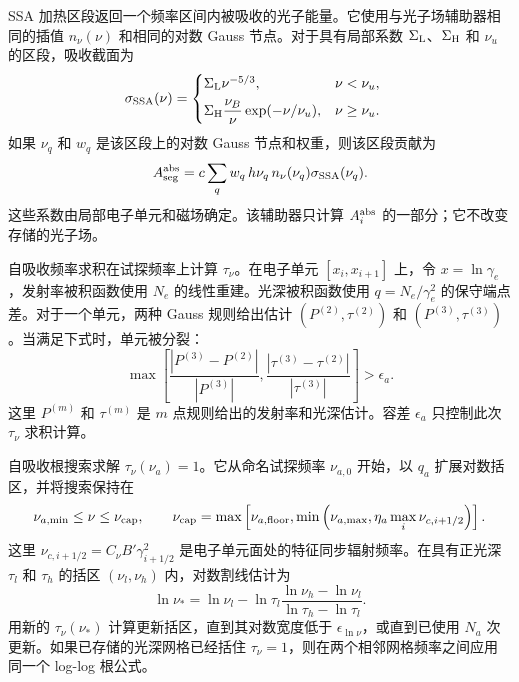 \documentclass[twocolumn]{aastex702}
\begin{document}
SSA 加热区段返回一个频率区间内被吸收的光子能量。它使用与光子场辅助器相同的插值 \(n_\nu(\nu)\) 和相同的对数 Gauss 节点。对于具有局部系数 \(\Sigma_{\rm L}\)、\(\Sigma_{\rm H}\) 和 \(\nu_u\) 的区段，吸收截面为
\begin{equation}
\begin{aligned}
\sigma_{\rm SSA}(\nu)&=
\begin{cases}
\Sigma_{\rm L}\nu^{-5/3}, & \nu<\nu_u,\\[1ex]
\Sigma_{\rm H}\dfrac{\nu_B}{\nu}\exp(-\nu/\nu_u), & \nu\ge\nu_u .
\end{cases}
\end{aligned}
\end{equation}
如果 \(\nu_q\) 和 \(w_q\) 是该区段上的对数 Gauss 节点和权重，则该区段贡献为
\begin{equation}
A_{\rm seg}^{\rm abs}
=c\sum_q w_q\,h\nu_q\,n_\nu(\nu_q)\sigma_{\rm SSA}(\nu_q).
\end{equation}
这些系数由局部电子单元和磁场确定。该辅助器只计算 \(A_i^{\rm abs}\) 的一部分；它不改变存储的光子场。

自吸收频率求积在试探频率上计算 \(\tau_\nu\)。在电子单元 \([x_i,x_{i+1}]\) 上，令 \(x=\ln\gamma_e\)，发射率被积函数使用 \(N_e\) 的线性重建。光深被积函数使用 \(q=N_e/\gamma_e^2\) 的保守端点差。对于一个单元，两种 Gauss 规则给出估计 \((P^{(2)},\tau^{(2)})\) 和 \((P^{(3)},\tau^{(3)})\)。当满足下式时，单元被分裂：
\begin{equation}
\max\left[
\frac{|P^{(3)}-P^{(2)}|}{|P^{(3)}|},
\frac{|\tau^{(3)}-\tau^{(2)}|}{|\tau^{(3)}|}
\right]>\epsilon_a .
\end{equation}
这里 \(P^{(m)}\) 和 \(\tau^{(m)}\) 是 \(m\) 点规则给出的发射率和光深估计。容差 \(\epsilon_a\) 只控制此次 \(\tau_\nu\) 求积计算。

自吸收根搜索求解 \(\tau_\nu(\nu_a)=1\)。它从命名试探频率 \(\nu_{a,0}\) 开始，以 \(q_a\) 扩展对数括区，并将搜索保持在
\begin{equation}
\nu_{a,\min}\le\nu\le
\nu_{\rm cap},\qquad
\nu_{\rm cap}=\max\left[\nu_{a,\rm floor},
\min\left(\nu_{a,\max},\eta_a\max_i\nu_{c,i+1/2}\right)\right].
\end{equation}
这里 \(\nu_{c,i+1/2}=C_\nu B'\gamma_{i+1/2}^2\) 是电子单元面处的特征同步辐射频率。在具有正光深 \(\tau_l\) 和 \(\tau_h\) 的括区 \((\nu_l,\nu_h)\) 内，对数割线估计为
\begin{equation}
\ln\nu_\ast=
\ln\nu_l-\ln\tau_l
\frac{\ln\nu_h-\ln\nu_l}{\ln\tau_h-\ln\tau_l}.
\end{equation}
用新的 \(\tau_\nu(\nu_\ast)\) 计算更新括区，直到其对数宽度低于 \(\epsilon_{\ln\nu}\)，或直到已使用 \(N_a\) 次更新。如果已存储的光深网格已经括住 \(\tau_\nu=1\)，则在两个相邻网格频率之间应用同一个 log-log 根公式。
\end{document}
